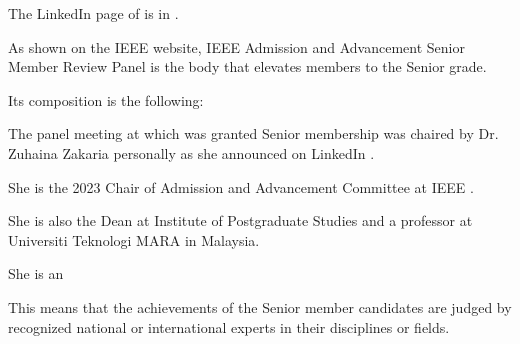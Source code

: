 The LinkedIn page of \MrIeeeReferenceOne is in .

As shown on the IEEE website,
IEEE Admission and Advancement Senior Member Review Panel
is the body that elevates members to the Senior grade.

Its composition is the following:



The panel meeting at which \mrl was granted Senior membership
was chaired by Dr. Zuhaina Zakaria personally as she announced on LinkedIn .

She is the 2023 Chair of Admission and Advancement Committee at IEEE .

She is also the Dean at Institute of Postgraduate Studies and
a professor at Universiti Teknologi MARA in Malaysia.

She is an


This means that the achievements of the Senior member candidates are judged
by recognized national or international experts in their disciplines or fields.
